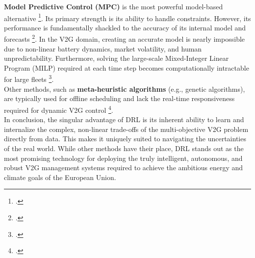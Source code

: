 \noindent
\textbf{Model Predictive Control (MPC)} is the most powerful model-based alternative \footcite{alsabbagh2022reinforcement}. Its primary strength is its ability to handle constraints. However, its performance is fundamentally shackled to the accuracy of its internal model and forecasts \footcite{faggio2023design}. In the V2G domain, creating an accurate model is nearly impossible due to non-linear battery dynamics, market volatility, and human unpredictability. Furthermore, solving the large-scale Mixed-Integer Linear Program (MILP) required at each time step becomes computationally intractable for large fleets \footcite{schwenk2022computationally}.
\\
\noindent
Other methods, such as \textbf{meta-heuristic algorithms} (e.g., genetic algorithms), are typically used for offline scheduling and lack the real-time responsiveness required for dynamic V2G control \footcite{ghosh2024optimal, kumar2024integration}.
\\
\noindent
In conclusion, the singular advantage of DRL is its inherent ability to learn and internalize the complex, non-linear trade-offs of the multi-objective V2G problem directly from data. This makes it uniquely suited to navigating the uncertainties of the real world. While other methods have their place, DRL stands out as the most promising technology for deploying the truly intelligent, autonomous, and robust V2G management systems required to achieve the ambitious energy and climate goals of the European Union.
